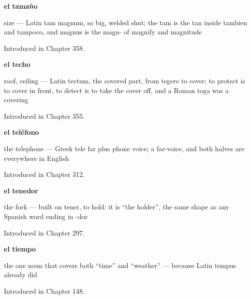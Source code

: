 \noindent\begin{minipage}[t]{\linewidth}
\raggedright
\textbf{el tamaño}\par
\small size — Latin tam magnum, so big, welded shut; the tam is the tan inside tambien and tampoco, and magnus is the magn- of magnify and magnitude\par
\footnotesize Introduced in Chapter 358.
\end{minipage}\par\medskip

\noindent\begin{minipage}[t]{\linewidth}
\raggedright
\textbf{el techo}\par
\small roof, ceiling — Latin tectum, the covered part, from tegere to cover; to protect is to cover in front, to detect is to take the cover off, and a Roman toga was a covering\par
\footnotesize Introduced in Chapter 355.
\end{minipage}\par\medskip

\noindent\begin{minipage}[t]{\linewidth}
\raggedright
\textbf{el teléfono}\par
\small the telephone — Greek tele far plus phone voice; a far-voice, and both halves are everywhere in English\par
\footnotesize Introduced in Chapter 312.
\end{minipage}\par\medskip

\noindent\begin{minipage}[t]{\linewidth}
\raggedright
\textbf{el tenedor}\par
\small the fork — built on tener, to hold: it is \textquotedblleft{}the holder\textquotedblright{}, the same shape as any Spanish word ending in -dor\par
\footnotesize Introduced in Chapter 297.
\end{minipage}\par\medskip

\noindent\begin{minipage}[t]{\linewidth}
\raggedright
\textbf{el tiempo}\par
\small the one noun that covers both \textquotedblleft{}time\textquotedblright{} and \textquotedblleft{}weather\textquotedblright{} — because Latin tempus already did\par
\footnotesize Introduced in Chapter 148.
\end{minipage}\par\medskip

